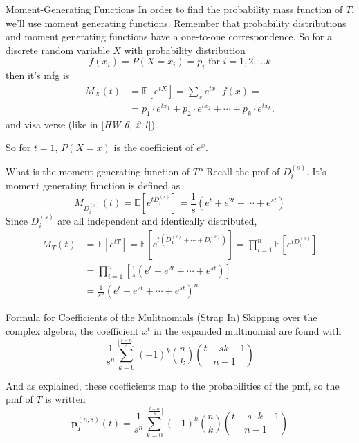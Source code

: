 \documentclass{beamer}
\begin{document}
\begin{frame}{Moment-Generating Functions}
    In order to find the probability mass function of $T$, we'll use moment generating functions. Remember that probability distributions and moment generating functions have a one-to-one correspondence. So for a discrete random variable $X$ with probability distribution
    $$
    f(x_i) = P(X = x_i) = p_i \text{ for } i = 1, 2, \ldots k
    $$
    then it's mfg is
    \begin{align*}
        M_X(t) &= \mathbb{E}[e^{tX}] = \sum_{x} e^{tx} \cdot f(x) =  \\
        &= p_1 \cdot e^{tx_1} + p_2 \cdot e^{tx_2} + \cdots + p_k \cdot e^{tx_k}.
    \end{align*}
    and visa verse (like in [\textit{HW 6, 2.1}]).

    So for $t = 1$, $P(X = x)$ is the coefficient of $e^x$.
\end{frame}

\begin{frame}{What is the moment generating function of $T$?}
    Recall the pmf of $D_{i}^{(s)}$. It's moment generating function is defined as
    $$
    M_{D_{i}^{(s)}}(t) = \mathbb{E}[e^{tD_{i}^{(s)}}] = \frac{1}{s}(e^{t} + e^{2t} + \cdots + e^{st})
    $$
    Since $D_{i}^{(s)}$ are all independent and identically distributed,
    \begin{align*}
        M_{T}(t) &= \mathbb{E}[e^{tT}] = \mathbb{E}[e^{t(D_{1}^{(s)} + \cdots + D_{n}^{(s)})}] = \prod_{i = 1}^{n} \mathbb{E}[e^{tD_{i}^{(s)}}] \\
        &= \prod_{i = 1}^{n} \left[\frac{1}{s}(e^{t} + e^{2t} + \cdots + e^{st}) \right] \\
        &= \frac{1}{s^n} (e^{t} + e^{2t} + \cdots + e^{st})^n
    \end{align*}
\end{frame}


\begin{frame}{Formula for Coefficients of the Mulitnomials (Strap In)}
    Skipping over the complex algebra, the coefficient $x^t$ in the expanded multinomial are found with
    $$
    \frac{1}{s^n} \sum_{k = 0}^{\lfloor\frac{t-n}{s} \rfloor} (-1)^k \binom{n}{k} \binom{t-sk-1}{n-1}
    $$

    And as explained, these coefficients map to the probabilities of the pmf, so the pmf of $T$ is written
    $$
    \textbf{p}_{T}^{(n, s)}(t) = \frac{1}{s^n} \sum_{k = 0}^{\lfloor\frac{t-n}{s} \rfloor} (-1)^k \binom{n}{k} \binom{t - s \cdot k - 1}{n-1}
    $$
\end{frame}
\end{document}
